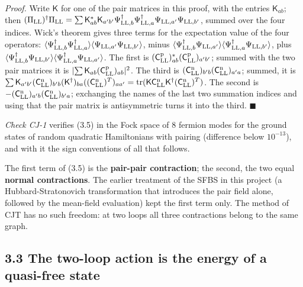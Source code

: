 \documentclass[
  10pt,
]{article}
\begin{document}
\emph{Proof.} Write \(\mathsf K\) for one of the pair matrices in this
proof, with the entries \(\mathsf K_{ab}\); then
\((\Pi_{\rm LL})^\dagger\Pi_{\rm LL}=\sum\mathsf K^*_{ab}\mathsf K_{a'b'}\Psi^\dagger_{{\rm LL},b}\Psi^\dagger_{{\rm LL},a}\Psi_{{\rm LL},a'}\Psi_{{\rm LL},b'}\),
summed over the four indices. Wick's theorem gives three terms for the
expectation value of the four operators:
\(\langle\Psi^\dagger_{{\rm LL},b}\Psi^\dagger_{{\rm LL},a}\rangle\langle\Psi_{{\rm LL},a'}\Psi_{{\rm LL},b'}\rangle\),
minus
\(\langle\Psi^\dagger_{{\rm LL},b}\Psi_{{\rm LL},a'}\rangle\langle\Psi^\dagger_{{\rm LL},a}\Psi_{{\rm LL},b'}\rangle\),
plus
\(\langle\Psi^\dagger_{{\rm LL},b}\Psi_{{\rm LL},b'}\rangle\langle\Psi^\dagger_{{\rm LL},a}\Psi_{{\rm LL},a'}\rangle\).
The first is
\((\mathsf C^{\rm p}_{\rm LL})^*_{ab}(\mathsf C^{\rm p}_{\rm LL})_{a'b'}\);
summed with the two pair matrices it is
\(\lvert\sum\mathsf K_{ab}(\mathsf C^{\rm p}_{\rm LL})_{ab}\rvert^2\).
The third is
\((\mathsf C^{\rm n}_{\rm LL})_{b'b}(\mathsf C^{\rm n}_{\rm LL})_{a'a}\);
summed, it is
\(\sum\mathsf K_{a'b'}(\mathsf C^{\rm n}_{\rm LL})_{b'b}(\mathsf K^\dagger)_{ba}((\mathsf C^{\rm n}_{\rm LL})^T)_{aa'} =\mathrm{tr}(\mathsf K\mathsf C^{\rm n}_{\rm LL}\mathsf K^\dagger(\mathsf C^{\rm n}_{\rm LL})^T)\).
The second is
\(-(\mathsf C^{\rm n}_{\rm LL})_{a'b}(\mathsf C^{\rm n}_{\rm LL})_{b'a}\);
exchanging the names of the last two summation indices and using that
the pair matrix is antisymmetric turns it into the third.
\(\blacksquare\)

\emph{Check CJ-1} verifies (3.5) in the Fock space of 8 fermion modes
for the ground states of random quadratic Hamiltonians with pairing
(difference below \(10^{-13}\)), and with it the sign conventions of all
that follows.

The first term of (3.5) is the \textbf{pair-pair contraction}; the
second, the two equal \textbf{normal contractions}. The earlier
treatment of the SFBS in this project (a Hubbard-Stratonovich
transformation that introduces the pair field alone, followed by the
mean-field evaluation) kept the first term only. The method of CJT has
no such freedom: at two loops all three contractions belong to the same
graph.

\hypertarget{the-two-loop-action-is-the-energy-of-a-quasi-free-state}{%
\subsection{3.3 The two-loop action is the energy of a quasi-free
state}\label{the-two-loop-action-is-the-energy-of-a-quasi-free-state}}
\end{document}
